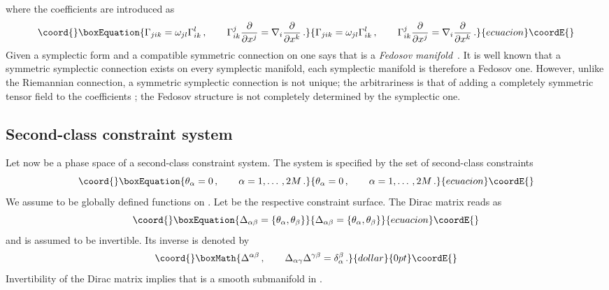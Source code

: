 \documentclass[a4paper,11pt]{amsart}
\numberwithin{thm}{section} %
\numberwithin{equation}{section} %
\numberwithin{figure}{section} %
\providecommand{\pb}[2]{\left\{{}#1{},{}#2{}\right\}}
\renewcommand{\:}{{\rm\, :\,}}
\def\d{\partial}
\providecommand{\dl}[1]{\displaystyle\frac{{\d}}{\d #1}}
\def\manM{{\mathcal M}}
\begin{document}
where the coefficients \coordHE{} are introduced as
\begin{equation}\coord{}\boxEquation{
  \Gamma_{jik}=\omega_{jl} \Gamma^l_{ik}\,, \qquad
  \Gamma^j_{ik}\dl{x^j}=\nabla_{i}\dl{x^k}\,.
}{
  \Gamma_{jik}=\omega_{jl} \Gamma^l_{ik}\,, \qquad
  \Gamma^j_{ik}\dl{x^j}=\nabla_{i}\dl{x^k}\,.
}{ecuacion}\coordE{}\end{equation}
Given a symplectic form and a compatible symmetric connection on
\myHighlight{$\manM$}\coordHE{} one says that \myHighlight{$\manM$}\coordHE{} is a \textit{Fedosov
  manifold}~\cite{[GRS]}.  It is well known that a symmetric symplectic
connection exists on every symplectic manifold, each
symplectic manifold is therefore a Fedosov one. However,
unlike the Riemannian connection, a symmetric symplectic connection is
not unique; the arbitrariness is that of adding a completely symmetric
tensor field to the coefficients \coordHE{}; the Fedosov structure
is not completely determined by the symplectic one.


\subsection{Second-class constraint system}
Let now \myHighlight{$\manM$}\coordHE{} be a phase space of a
second-class constraint system.  The system is specified by the set of
second-class constraints
\begin{equation}\coord{}\boxEquation{
\theta_\alpha=0\,,\qquad \alpha=1,\ldots\,,2M\,.
\label{eq:constraints}
}{
\theta_\alpha=0\,,\qquad \alpha=1,\ldots\,,2M\,.
}{ecuacion}\coordE{}\end{equation}
We assume \myHighlight{$\theta_\alpha$}\coordHE{} to be globally defined functions on \myHighlight{$\manM$}\coordHE{}.
Let \myHighlight{$\Sigma \subset \manM$}\coordHE{} be the respective constraint
surface.  The Dirac matrix reads as
\begin{equation}\coord{}\boxEquation{
  \label{eq:dirac-matrix}
\Delta_{\alpha \beta}=\pb{\theta_\alpha}{\theta_\beta}
}{
  \Delta_{\alpha \beta}=\pb{\theta_\alpha}{\theta_\beta}
}{ecuacion}\coordE{}\end{equation}
and is assumed to be invertible. Its inverse is denoted by
$$\coord{}\boxMath{
\Delta^{\alpha \beta}\,,\qquad
 \Delta_{\alpha \gamma}\Delta^{\gamma \beta}=\delta^\beta_\alpha\,.
}{dollar}{0pt}\coordE{}$$
Invertibility of the Dirac matrix implies that
\myHighlight{$\Sigma$}\coordHE{} is a smooth submanifold in \myHighlight{$\manM$}\coordHE{}.
\end{document}
